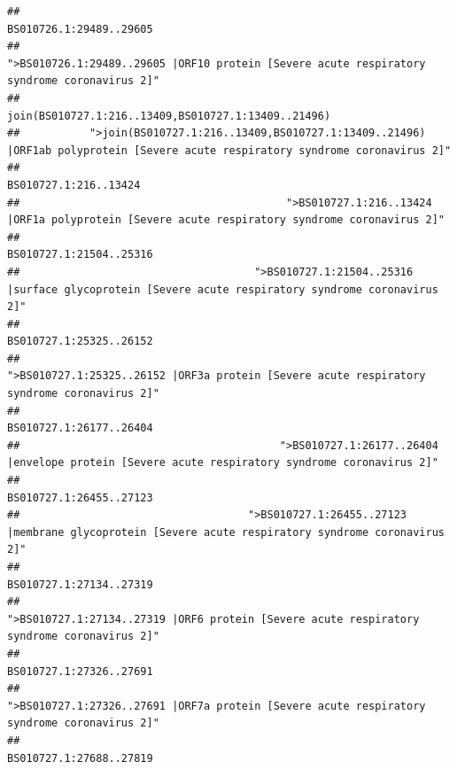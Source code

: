 \documentclass[
]{article}
\begin{document}
\begin{verbatim}
##                                                                                                                BS010726.1:29489..29605 
##                                            ">BS010726.1:29489..29605 |ORF10 protein [Severe acute respiratory syndrome coronavirus 2]" 
##                                                                                    join(BS010727.1:216..13409,BS010727.1:13409..21496) 
##           ">join(BS010727.1:216..13409,BS010727.1:13409..21496) |ORF1ab polyprotein [Severe acute respiratory syndrome coronavirus 2]" 
##                                                                                                                  BS010727.1:216..13424 
##                                          ">BS010727.1:216..13424 |ORF1a polyprotein [Severe acute respiratory syndrome coronavirus 2]" 
##                                                                                                                BS010727.1:21504..25316 
##                                     ">BS010727.1:21504..25316 |surface glycoprotein [Severe acute respiratory syndrome coronavirus 2]" 
##                                                                                                                BS010727.1:25325..26152 
##                                            ">BS010727.1:25325..26152 |ORF3a protein [Severe acute respiratory syndrome coronavirus 2]" 
##                                                                                                                BS010727.1:26177..26404 
##                                         ">BS010727.1:26177..26404 |envelope protein [Severe acute respiratory syndrome coronavirus 2]" 
##                                                                                                                BS010727.1:26455..27123 
##                                    ">BS010727.1:26455..27123 |membrane glycoprotein [Severe acute respiratory syndrome coronavirus 2]" 
##                                                                                                                BS010727.1:27134..27319 
##                                             ">BS010727.1:27134..27319 |ORF6 protein [Severe acute respiratory syndrome coronavirus 2]" 
##                                                                                                                BS010727.1:27326..27691 
##                                            ">BS010727.1:27326..27691 |ORF7a protein [Severe acute respiratory syndrome coronavirus 2]" 
##                                                                                                                BS010727.1:27688..27819 

\end{verbatim}
\end{document}
